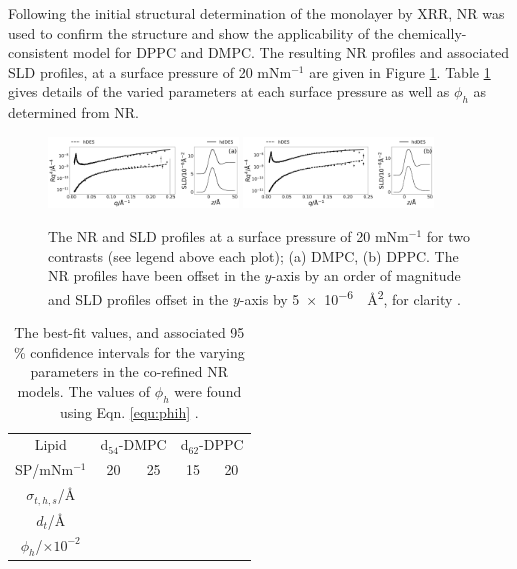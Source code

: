 \documentclass[amsmath,amssymb,twocolumn,superscriptaddress]{revtex4-1}
\begin{document}
Following the initial structural determination of the monolayer by XRR, NR was used to confirm the structure and show the applicability of the chemically-consistent model for DPPC and DMPC.
The resulting NR profiles and associated SLD profiles, at a surface pressure of 20 mNm$^{-1}$ are given in Figure \ref{fig:neutron}.
Table \ref{tab:neutron} gives details of the varied parameters at each surface pressure as well as $\phi_h$ as determined from NR.
%
\begin{figure}
	\centering
  \includegraphics[width=0.45\textwidth]{figures/dmpc_20n_ref_sld}
	\includegraphics[width=0.45\textwidth]{figures/dppc_20n_ref_sld}
	\caption{\small The NR and SLD profiles at a surface pressure of
  20 mNm$^{-1}$ for two contrasts (see legend above each plot); (a) DMPC,
  (b) DPPC. The NR profiles have been offset in the $y$-axis by an order of
  magnitude and SLD profiles offset in the $y$-axis by
  \SI{5e-6}{\per\square\angstrom}, for clarity \cite{SI2019}.}
	\label{fig:neutron}
\end{figure}
%
%
\begin{table}
  \caption{\label{tab:neutron} The best-fit values, and associated 95 \%
  confidence intervals for the varying parameters in the co-refined NR models.
  The values of $\phi_h$ were found using Eqn. \ref{equ:phih} \cite{SI2019}.}
  \begin{ruledtabular}
	\begin{tabular*}{\textwidth}{ccccc}
    Lipid & \multicolumn{2}{c}{d$_{54}$-DMPC} & \multicolumn{2}{c}{d$_{62}$-DPPC} \\
    SP/mNm$^{-1}$ & 20 & 25 & 15 & 20 \\
    \hline
    $\sigma_{t,h,s}$/\si{\angstrom} &  &  &  &  \\
    $d_t$/\si{\angstrom} &  &  &  &  \\
    \hline
    $\phi_h$/$\times10^{-2}$ &  &  &  &  \\
	\end{tabular*}
  \end{ruledtabular}
\end{table}
%
\end{document}
